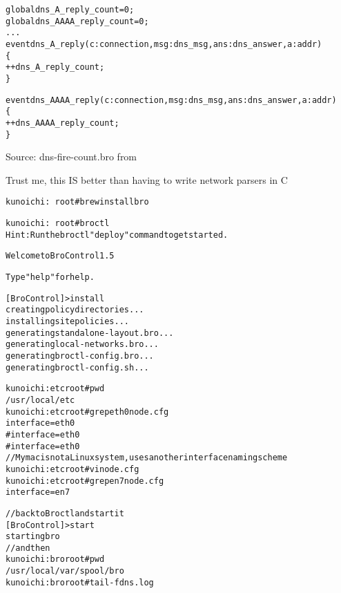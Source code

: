 \documentclass[20pt,landscape,a4paper,footrule]{foils}
\begin{document}

\begin{alltt}\small
global dns_A_reply_count=0;
global dns_AAAA_reply_count=0;
...
event dns_A_reply(c: connection, msg: dns_msg, ans: dns_answer, a: addr)
	\{
	++dns_A_reply_count;
	\}

event dns_AAAA_reply(c: connection, msg: dns_msg, ans: dns_answer, a: addr)
	\{
	++dns_AAAA_reply_count;
	\}
\end{alltt}

Source: dns-fire-count.bro from\\
{\small {}}

Trust me, this IS better than having to write network parsers in C \smiley




\begin{alltt}\small
kunoichi:~ root# brew install bro

kunoichi:~ root# broctl
Hint: Run the broctl "deploy" command to get started.

Welcome to BroControl 1.5

Type "help" for help.

[BroControl] > install
creating policy directories ...
installing site policies ...
generating standalone-layout.bro ...
generating local-networks.bro ...
generating broctl-config.bro ...
generating broctl-config.sh ...
\end{alltt}


\begin{alltt}\small
kunoichi:etc root# pwd
/usr/local/etc
kunoichi:etc root# grep eth0 node.cfg
interface=eth0
#interface=eth0
#interface=eth0
// My mac is not a Linux system, uses another interface naming scheme
kunoichi:etc root# vi node.cfg
kunoichi:etc root# grep en7 node.cfg
interface=en7
\end{alltt}


\begin{alltt}\small
// back to Broctl and start it
[BroControl] > start
starting bro
// and then
kunoichi:bro root# pwd
/usr/local/var/spool/bro
kunoichi:bro root# tail -f dns.log
\end{alltt}
\end{document}
